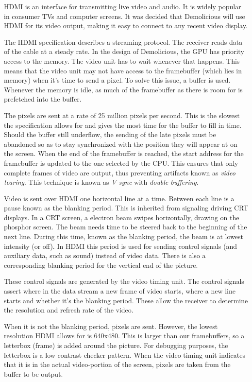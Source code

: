 \documentclass[../main/report.tex]{subfiles}
\begin{document}
HDMI is an interface for transmitting live video and audio.
It is widely popular in consumer TVs and computer screens.
It was decided that Demolicious will use HDMI for its video output, making it easy to connect to any recent video display.

The HDMI specification describes a streaming protocol.
The receiver reads data of the cable at a steady rate.
In the design of Demolicious, the GPU has priority access to the memory.
The video unit has to wait whenever that happens.
This means that the video unit may not have access to the framebuffer (which lies in memory) when it's time to send a pixel.
To solve this issue, a buffer is used.
Whenever the memory is idle, as much of the framebuffer as there is room for is prefetched into the buffer.

The pixels are sent at a rate of 25 million pixels per second.
This is the slowest the specification allows for and gives the most time for the buffer to fill in time.
Should the buffer still underflow, the sending of the late pixels must be abandoned so as to stay synchronized with the position they will appear at on the screen.
When the end of the framebuffer is reached, the start address for the framebuffer is updated to the one selected by the CPU.
This ensures that only complete frames of video are output, thus preventing artifacts known as \emph{video tearing}.
This technique is known as \emph{V-sync} with \emph{double buffering}.

Video is sent over HDMI one horizontal line at a time.
Between each line is a pause known as the blanking period.
This is inherited from signaling driving CRT displays.
In a CRT screen, a electron beam swipes horizontally, drawing on the phosphor screen.
The beam needs time to be steered back to the beginning of the next line.
During this time, known as the blanking period, the beam is at lowest intensity (or off).
In HDMI this period is used for sending control signals (and auxiliary data, such as sound) instead of video data.
There is also a corresponding blanking period for the vertical end of the picture.

These control signals are generated by the video timing unit.
The control signals assert where in the data stream a new frame of video starts, where a new line starts and whether it's the blanking period.
These allow the receiver to determine the resolution and refresh rate of the video.

When it is not the blanking period, pixels are sent.
However, the lowest resolution HDMI allows for is 640x480.
This is larger than our framebuffers, so a letterbox (frame) is added around the picture.
For debugging purposes, the letterbox is a low-contrast checker pattern.
When the video timing unit indicates that it is in the actual video-portion of the screen, pixels are taken from the buffer to be output.
\end{document}
